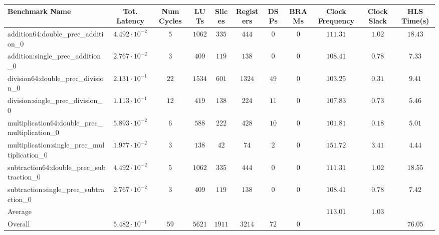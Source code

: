 \begin{tabular}{|l|c|c|c|c|c|c|c|c|c|c|}
\hline
Benchmark Name                                   & Tot. Latency            & Num Cycles & LUTs     & Slices   & Registers & DSPs   & BRAMs & Clock Frequency & Clock Slack & HLS Time(s) \\
\hline
addition64:double\_prec\_addition\_0             & $ 4.492 \cdot 10^{-2} $ & $ 5      $ & $ 1062 $ & $ 335  $ & $ 444   $ & $ 0  $ & $ 0 $ & $ 111.31      $ & $ 1.02    $ & $ 18.43   $ \\
addition:single\_prec\_addition\_0               & $ 2.767 \cdot 10^{-2} $ & $ 3      $ & $ 409  $ & $ 119  $ & $ 138   $ & $ 0  $ & $ 0 $ & $ 108.41      $ & $ 0.78    $ & $ 7.33    $ \\
division64:double\_prec\_division\_0             & $ 2.131 \cdot 10^{-1} $ & $ 22     $ & $ 1534 $ & $ 601  $ & $ 1324  $ & $ 49 $ & $ 0 $ & $ 103.25      $ & $ 0.31    $ & $ 9.41    $ \\
division:single\_prec\_division\_0               & $ 1.113 \cdot 10^{-1} $ & $ 12     $ & $ 419  $ & $ 138  $ & $ 224   $ & $ 11 $ & $ 0 $ & $ 107.83      $ & $ 0.73    $ & $ 5.46    $ \\
multiplication64:double\_prec\_multiplication\_0 & $ 5.893 \cdot 10^{-2} $ & $ 6      $ & $ 588  $ & $ 222  $ & $ 428   $ & $ 10 $ & $ 0 $ & $ 101.81      $ & $ 0.18    $ & $ 5.01    $ \\
multiplication:single\_prec\_multiplication\_0   & $ 1.977 \cdot 10^{-2} $ & $ 3      $ & $ 138  $ & $ 42   $ & $ 74    $ & $ 2  $ & $ 0 $ & $ 151.72      $ & $ 3.41    $ & $ 4.44    $ \\
subtraction64:double\_prec\_subtraction\_0       & $ 4.492 \cdot 10^{-2} $ & $ 5      $ & $ 1062 $ & $ 335  $ & $ 444   $ & $ 0  $ & $ 0 $ & $ 111.31      $ & $ 1.02    $ & $ 18.55   $ \\
subtraction:single\_prec\_subtraction\_0         & $ 2.767 \cdot 10^{-2} $ & $ 3      $ & $ 409  $ & $ 119  $ & $ 138   $ & $ 0  $ & $ 0 $ & $ 108.41      $ & $ 0.78    $ & $ 7.42    $ \\
\hline
Average                                          & $                     $ & $        $ & $      $ & $      $ & $       $ & $    $ & $   $ & $ 113.01      $ & $ 1.03    $ & $         $ \\
\hline
Overall                                          & $ 5.482 \cdot 10^{-1} $ & $ 59     $ & $ 5621 $ & $ 1911 $ & $ 3214  $ & $ 72 $ & $ 0 $ & $             $ & $         $ & $ 76.05   $ \\
\hline
\end{tabular}
